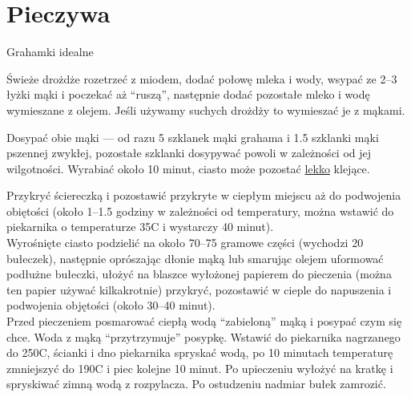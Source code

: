 \documentclass[a4paper,12pt]{article}
\begin{document}
\newpage
\section{Pieczywa}


\begin{recipe}{Grahamki idealne}{}{}


Świeże drożdże rozetrzeć z miodem, dodać połowę mleka i wody, wsypać ze 2--3 łyżki mąki i poczekać aż ``ruszą'',
następnie dodać pozostałe mleko i wodę wymieszane z olejem. Jeśli używamy suchych drożdży to  wymieszać je z mąkami.

Dosypać obie mąki --- od razu 5 szklanek mąki grahama i 1.5 szklanki mąki pszennej zwykłej, pozostałe  szklanki dosypywać powoli w zależności od jej wilgotności. Wyrabiać około 10 minut, ciasto
może pozostać \underline{lekko} klejące.

\freeform{}%
Przykryć ściereczką i pozostawić przykryte w ciepłym miejscu aż do podwojenia obiętości (około 1--1.5 godziny w zależności od temperatury, można wstawić do piekarnika o temperaturze 35\0C i
wystarczy 40 minut).\\

Wyrośnięte ciasto podzielić na około 70--75 gramowe części (wychodzi 20 bułeczek), następnie oprószając dłonie mąką lub smarując olejem uformować podłużne bułeczki, ułożyć na
blaszce wyłożonej papierem do pieczenia (można ten papier używać kilkakrotnie) przykryć, pozostawić w cieple do napuszenia i podwojenia objętości (około 30--40 minut).\\

Przed pieczeniem posmarować ciepłą wodą ``zabieloną'' mąką i posypać czym się chce. Woda z mąką ``przytrzymuje'' posypkę. Wstawić do piekarnika nagrzanego do 250\0C, ścianki i dno piekarnika spryskać wodą, po 10 minutach
temperaturę zmniejszyć do 190\0C i piec kolejne 10 minut. Po upieczeniu wyłożyć na kratkę i spryskiwać zimną wodą z rozpylacza. Po ostudzeniu nadmiar bułek zamrozić.

\end{recipe}
\end{document}
